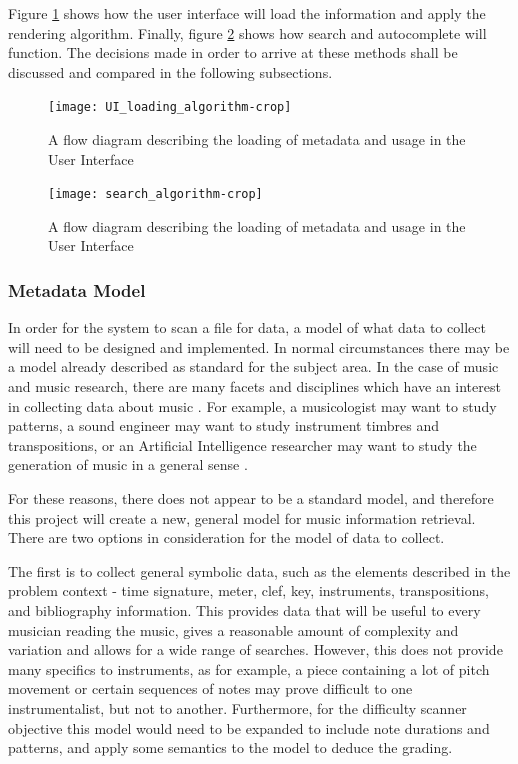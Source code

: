 Figure \ref{fig:uiLoader} shows how the user interface will load the information and apply the rendering algorithm. Finally, figure \ref{fig:metaSearching} shows how search and autocomplete will function. The decisions made in order to arrive at these methods shall be discussed and compared in the following subsections.
\begin{figure}[H]
    \centering
    \texttt{[image: UI\_loading\_algorithm-crop]}
    \caption{A flow diagram describing the loading of metadata and usage in the User Interface}
    \label{fig:uiLoader}
\end{figure}
\begin{figure}[H]
    \centering
    \texttt{[image: search\_algorithm-crop]}
    \caption{A flow diagram describing the loading of metadata and usage in the User Interface}
    \label{fig:metaSearching}
\end{figure}
\subsubsection{Metadata Model}
In order for the system to scan a file for data, a model of what data to collect will need to be designed and implemented. In normal circumstances there may be a model already described as standard for the subject area. In the case of music and music research, there are many facets and disciplines which have an interest in collecting data about music \parencite{MIR}. For example, a musicologist may want to study patterns, a sound engineer may want to study instrument timbres and transpositions, or an Artificial Intelligence researcher may want to study the generation of music in a general sense \parencite{creativeMachines}. 

For these reasons, there does not appear to be a standard model, and therefore this project will create a new, general model for music information retrieval.
There are two options in consideration for the model of data to collect.

The first is to collect general symbolic data, such as the elements described in the problem context - time signature, meter, clef, key, instruments, transpositions, and bibliography information. This provides data that will be useful to every musician reading the music, gives a reasonable amount of complexity and variation and allows for a wide range of searches.
However, this does not provide many specifics to instruments, as for example, a piece containing a lot of pitch movement or certain sequences of notes may prove difficult to one instrumentalist, but not to another. 
Furthermore, for the difficulty scanner objective this model would need to be expanded to include note durations and patterns, and apply some semantics to the model to deduce the grading.

